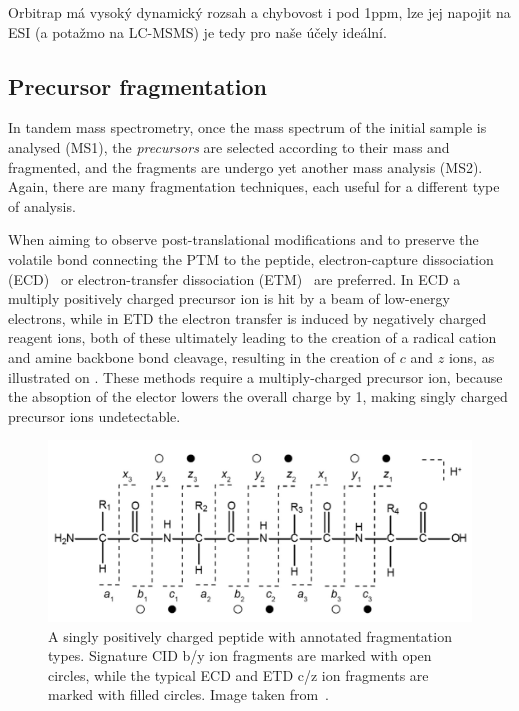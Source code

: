 Orbitrap má vysoký dynamický rozsah a chybovost i pod 1ppm, lze jej napojit na ESI (a potažmo na LC-MSMS) je tedy pro naše účely ideální.


\subsection{Precursor fragmentation}

In tandem mass spectrometry, once the mass spectrum of the initial sample is analysed (MS1), the \emph{precursors} are selected according to their mass and fragmented, and the fragments are undergo yet another mass analysis (MS2). Again, there are many fragmentation techniques, each useful for a different type of analysis.

When aiming to observe post-translational modifications and to preserve the volatile bond connecting the PTM to the peptide, electron-capture dissociation (ECD)~\cite{zubarev2000electron} or electron-transfer dissociation (ETM)~\cite{syka2004peptide} are preferred. In ECD a multiply positively charged precursor ion is hit by a beam of low-energy electrons, while in ETD the electron transfer is induced by negatively charged reagent ions, both of these ultimately leading to the creation of a radical cation and amine backbone bond cleavage, resulting in the creation of \(c\) and \(z\) ions, as illustrated on . These methods require a multiply-charged precursor ion, because the absoption of the elector lowers the overall charge by 1, making singly charged precursor ions undetectable.

\begin{figure}
  \centering
  \includegraphics[width=.75\linewidth]{img/fragment-types.png}
  \caption{A singly positively charged peptide with annotated fragmentation types. Signature CID b/y ion fragments are marked with open circles, while the typical ECD and ETD c/z ion fragments are marked with filled circles. Image taken from~\citet{hart2014review}.}\label{fig:fragment-types}
\end{figure}

